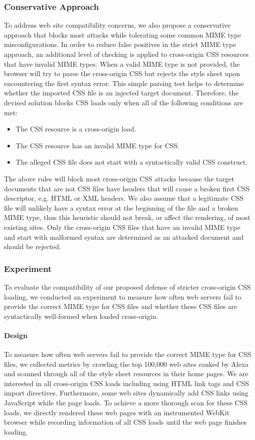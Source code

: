 \documentclass{acm_proc_article-sp}
\begin{document}
\subsubsection{Conservative Approach}
To address web site compatibility concerns, we also propose a conservative approach that blocks most attacks while tolerating some common MIME type misconfigurations. In order to reduce false positives in the strict MIME type approach, an additional level of checking is applied to cross-origin CSS resources that have invalid MIME types. When a valid MIME type is not provided, the browser will try to parse the cross-origin CSS but rejects the style sheet upon encountering the first syntax error. This simple parsing test helps to determine whether the imported CSS file is an injected target document. Therefore, the devised solution blocks CSS loads only when all of the following conditions are met:
\begin{itemize}
\item{The CSS resource is a cross-origin load.}
\item{The CSS resource has an invalid MIME type for CSS.}
\item{The alleged CSS file does not start with a syntactically valid CSS construct.}
\end{itemize}
The above rules will block most cross-origin CSS attacks because the target documents that are not CSS files have headers that will cause a broken first CSS descriptor, e.g. HTML or XML headers. We also assume that a legitimate CSS file will unlikely have a syntax error at the beginning of the file and a broken MIME type, thus this heuristic should not break, or affect the rendering, of most existing sites. Only the cross-origin CSS files that have an invalid MIME type and start with malformed syntax are determined as an attacked document and should be rejected.

\subsubsection{Experiment}
To evaluate the compatibility of our proposed defense of stricter cross-origin CSS loading, we conducted an experiment to measure how often web servers fail to provide the correct MIME type for CSS files and whether these CSS files are syntactically well-formed when loaded cross-origin.

\paragraph{Design}
To measure how often web servers fail to provide the correct MIME type for CSS files, we collected metrics by crawling the top 100,000 web sites ranked by Alexa~\cite{alexa} and scanned through all of the style sheet resources in their home pages. We are interested in all cross-origin CSS loads including using HTML link tags and CSS import directives. Furthermore, some web sites dynamically add CSS links using JavaScript while the page loads. To achieve a more thorough scan for these CSS loads, we directly rendered these web pages with an instrumented WebKit browser while recording information of all CSS loads until the web page finishes loading.
\end{document}
